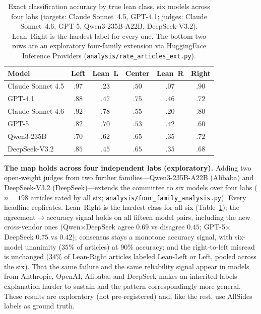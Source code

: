 \documentclass{article}
\begin{document}
\begin{table}[h]\centering\small
\begin{tabular}{lccccc}
\toprule
Model & Left & Lean~L & Center & \textbf{Lean~R} & Right \\
\midrule
Claude Sonnet 4.5 & $.97$ & $.23$ & $.50$ & $\mathbf{.07}$ & $.90$ \\
GPT-4.1 & $.88$ & $.47$ & $.75$ & $\mathbf{.46}$ & $.72$ \\
Claude Sonnet 4.6 & $.92$ & $.78$ & $.55$ & $\mathbf{.20}$ & $.80$ \\
GPT-5 & $.82$ & $.70$ & $.53$ & $\mathbf{.42}$ & $.60$ \\
Qwen3-235B & $.70$ & $.62$ & $.65$ & $\mathbf{.35}$ & $.72$ \\
DeepSeek-V3.2 & $.85$ & $.45$ & $.65$ & $\mathbf{.35}$ & $.68$ \\
\bottomrule
\end{tabular}
\caption{Exact classification accuracy by true lean class, six models
across four labs (targets: Claude Sonnet~4.5, GPT-4.1; judges: Claude
Sonnet~4.6, GPT-5, Qwen3-235B-A22B, DeepSeek-V3.2). Lean~Right is the
hardest label for every one. The bottom two rows are an exploratory
four-family extension via HuggingFace Inference Providers
(\texttt{analysis/rate\_articles\_ext.py}).}
\label{tab:byclass}
\end{table}

\textbf{The map holds across four independent labs (exploratory).}
Adding two open-weight judges from two further families---Qwen3-235B-A22B
(Alibaba) and DeepSeek-V3.2 (DeepSeek)---extends the committee to six
models over four labs ($n{=}198$ articles rated by all six;
\texttt{analysis/four\_family\_analysis.py}). Every headline
replicates. Lean~Right is the hardest class for all six
(Table~\ref{tab:byclass}); the agreement$\to$accuracy signal holds on
all fifteen model pairs, including the new cross-vendor ones
(Qwen$\times$DeepSeek agree $0.69$ vs disagree $0.45$;
GPT-5$\times$DeepSeek $0.75$ vs $0.42$); consensus stays a monotone
accuracy signal, with six-model unanimity ($35\%$ of articles) at
$90\%$ accuracy; and the right-to-left misread is unchanged ($34\%$ of
Lean-Right articles labeled Lean-Left or Left, pooled across the six).
That the same failure and the same reliability signal appear in models
from Anthropic, OpenAI, Alibaba, and DeepSeek makes an
inherited-labels explanation harder to sustain and the pattern
correspondingly more general. These results are exploratory (not
pre-registered) and, like the rest, use AllSides labels as ground
truth.
\end{document}
